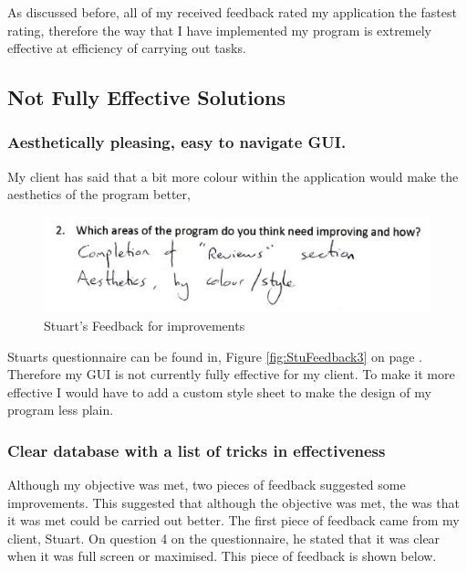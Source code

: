 As discussed before, all of my received feedback rated my application the fastest rating, therefore the way that I have implemented my program is extremely effective at efficiency of carrying out tasks.

\subsection{Not Fully Effective Solutions}

	\subsubsection{Aesthetically pleasing, easy to navigate GUI.}

My client has said that a bit more colour within the application would make the aesthetics of the program better, 

\begin{figure}[H]
    \includegraphics[width=\textwidth]{./Evaluation/images/StuImprovements.jpg}
    \caption{Stuart's Feedback for improvements} \label{fig:StuImprovementFeedback}
\end{figure}

Stuarts questionnaire can be found in, Figure \ref{fig:StuFeedback3} on page \pageref{fig:StuFeedback3}. Therefore my GUI is not currently fully effective for my client. To make it more effective I would have to add a custom style sheet to make the design of my program less plain. 

\subsubsection{Clear database with a list of tricks in effectiveness}

Although my objective was met, two pieces of feedback suggested some improvements. This suggested that although the objective was met, the was that it was met could be carried out better. The first piece of feedback came from my client, Stuart. On question 4 on the questionnaire, he stated that it was clear when it was full screen or maximised. This piece of feedback is shown below.

